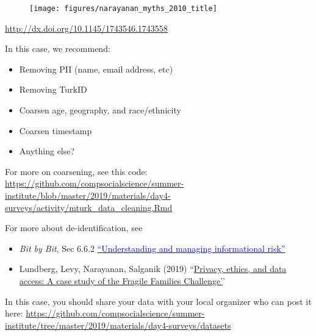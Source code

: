 \documentclass[aspectratio=169]{beamer}
\begin{document}
\begin{frame}

\begin{figure}
  \centering
  \texttt{[image: figures/narayanan\_myths\_2010\_title]}
\end{figure}

\vfill
\url{http://dx.doi.org/10.1145/1743546.1743558}
\end{frame}
\begin{frame}

In this case, we recommend:
\begin{itemize}
\item Removing PII (name, email address, etc)
\item Removing TurkID
\item Coarsen age, geography, and race/ethnicity
\item Coarsen timestamp
\item Anything else?
\end{itemize}

For more on coarsening, see this code:\\
\url{https://github.com/compsocialscience/summer-institute/blob/master/2019/materials/day4-surveys/activity/mturk_data_cleaning.Rmd}

\end{frame}
\begin{frame}

For more about de-identification, see 
\begin{itemize}
\item \textit{Bit by Bit}, Sec 6.6.2 \href{https://www.bitbybitbook.com/en/1st-ed/ethics/dilemmas/info-risk/}{\textcolor{blue}{``Understanding and managing informational risk''}}
\item Lundberg, Levy, Narayanan, Salganik (2019) ``\href{https://arxiv.org/abs/1809.00103}{Privacy, ethics, and data access: A case study of the Fragile Families Challenge'}'
\end{itemize}

\end{frame}
\begin{frame}

In this case, you should share your data with your local organizer who can post it here:
\url{https://github.com/compsocialscience/summer-institute/tree/master/2019/materials/day4-surveys/datasets}

\end{frame}
\end{document}
